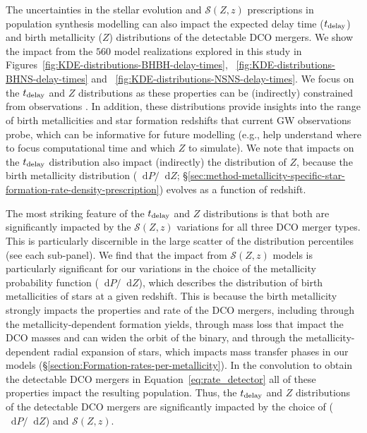 \documentclass[fleqn,usenatbib]{mnras}
\newcommand{\Zi}{\ensuremath{Z}\xspace}
\newcommand{\SFRD}{\ensuremath{\mathcal{S}(Z,z)}\xspace}
\newcommand{\tdelay}{\ensuremath{{t}_{\rm{delay}}}\xspace}
\newcommand*\diff{\mathop{}\!\mathrm{d}}
\newcommand{\Nmodels}{\ensuremath{560}\xspace}
\begin{document}
The uncertainties in the stellar evolution and \SFRD prescriptions in population synthesis modelling can also impact the expected delay time (\tdelay) and birth metallicity (\Zi) distributions of the detectable \ac{DCO} mergers. We show the impact from the \Nmodels model realizations explored in this study in Figures~\ref{fig:KDE-distributions-BHBH-delay-times}, ~\ref{fig:KDE-distributions-BHNS-delay-times} and ~\ref{fig:KDE-distributions-NSNS-delay-times}.  We focus on the \tdelay and \Zi distributions as these properties can be (indirectly) constrained from observations \citep[e.g.,][]{Im:2017,Safarzadeh:2019delayTimes,FishbachKalogera:2021delayTimes}. In addition, these distributions provide insights into the range of birth metallicities and star formation redshifts that current GW observations probe, which can be informative for future modelling (e.g., help understand where to focus computational time and which \Zi to simulate). 
We note that impacts on the \tdelay distribution also impact (indirectly) the distribution of \Zi, because the birth metallicity distribution ($\diff P/ \diff Z$; \S\ref{sec:method-metallicity-specific-star-formation-rate-density-prescription}) evolves as a function of redshift. 

The most striking feature of the \tdelay and \Zi distributions is that both are significantly impacted by the \SFRD variations for all three \ac{DCO} merger types. This is particularly discernible in the large scatter of the distribution percentiles (see each sub-panel). We find that the impact from \SFRD models is particularly significant for our variations in the choice of the metallicity probability function ($\diff P / \diff Z$), which describes the distribution of birth metallicities of stars at a given redshift. This is because the birth metallicity strongly impacts the properties and rate of the \ac{DCO} mergers, including through the metallicity-dependent formation yields, through mass loss that impact the \ac{DCO} masses and can widen the orbit of the binary, and through the metallicity-dependent radial expansion of stars, which impacts mass transfer phases in our models (\S\ref{section:Formation-rates-per-metallicity}). In the convolution to obtain the detectable \ac{DCO} mergers in Equation~\ref{eq:rate_detector} all of these properties impact the resulting population. Thus, the \tdelay and \Zi distributions of the detectable \ac{DCO} mergers are significantly impacted by the choice of ($\diff P / \diff Z$) and \SFRD. 
\end{document}
